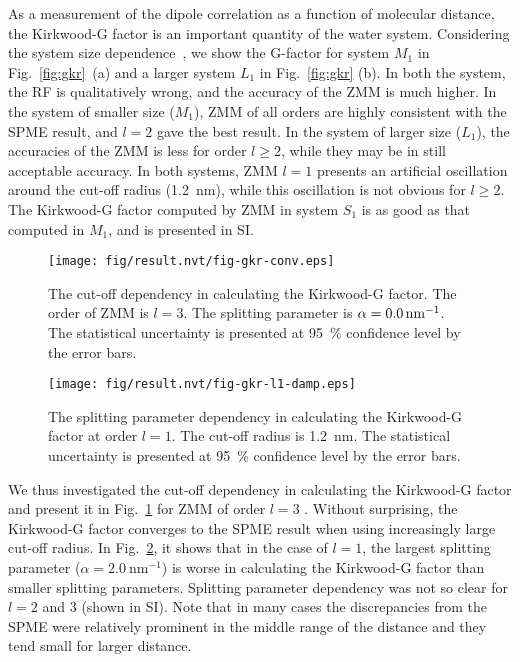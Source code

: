 \documentclass[a4paper,preprint,unsortedaddress,onecolumn,fleqn]{revtex4}
\begin{document}
As a measurement of the dipole correlation as a function of molecular
distance, the Kirkwood-G factor is an important quantity of the water
system. Considering the system size dependence~\cite{vanderSpoel2006origin},
we show the G-factor for system $M_{1}$ in Fig.~\ref{fig:gkr}~(a) and a
larger system $L_{1}$ in Fig.~\ref{fig:gkr} (b). In both the system, the RF
is qualitatively wrong, and the accuracy of the ZMM  is much
higher. In the system of smaller size ($M_{1}$), ZMM  of all orders are
highly consistent with the SPME result, and $l=2$ gave the best result. In the
system of larger size ($L_{1}$), the accuracies of the ZMM  is less for
order $l\geq 2$, while they may be in still acceptable accuracy. In both
systems, ZMM $l=1$ presents an artificial oscillation around the cut-off
radius (1.2~nm), while this oscillation is not obvious for $l\geq 2$. The
Kirkwood-G factor computed by ZMM in system $S_{1}$ is as good as that
computed in $M_{1}$, and is presented in SI.

\begin{figure}[tbp]
\centering
\texttt{[image: fig/result.nvt/fig-gkr-conv.eps]}
\caption{ The cut-off dependency in calculating the Kirkwood-G factor. The
order of ZMM  is $l=3$. The splitting parameter is $\protect\alpha %
=0.0\,\text{nm}^{-1}$. The statistical uncertainty is presented at 95~\%
confidence level by the error bars. }
\label{fig:gkr-conv}
\end{figure}

\begin{figure}[tbp]
\centering
\texttt{[image: fig/result.nvt/fig-gkr-l1-damp.eps]}
\caption{ The splitting parameter dependency in calculating the Kirkwood-G
factor at order $l=1$. The cut-off radius is 1.2~nm. The statistical
uncertainty is presented at 95~\% confidence level by the error bars. }
\label{fig:gkr-damp-l1}
\end{figure}

We thus investigated the cut-off dependency in calculating the Kirkwood-G
factor and present it in Fig.~\ref{fig:gkr-conv} for ZMM  of order $l=3$%
. Without surprising, the Kirkwood-G factor converges to the SPME result
when using increasingly large cut-off radius. In Fig.~\ref{fig:gkr-damp-l1},
it shows that in the case of $l=1$, the largest splitting parameter ($\alpha
=2.0\ \text{nm}^{-1}$) is worse in calculating the Kirkwood-G factor than
smaller splitting parameters. Splitting parameter dependency was not so
clear for $l=2$ and 3 (shown in SI). Note that in many cases the
discrepancies from the SPME were relatively prominent in the middle range of
the distance and they tend small for larger distance.
\end{document}
